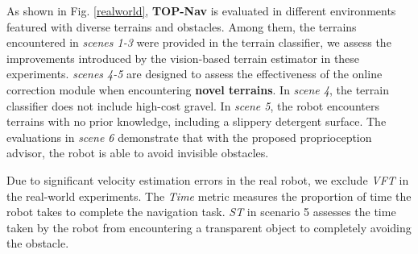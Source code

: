 \documentclass[conference]{IEEEtran}
\begin{document}
As shown in Fig. \ref{realworld}, \textbf{TOP-Nav} is evaluated in different environments featured with diverse terrains and obstacles. Among them, the terrains encountered in \textit{scenes 1-3} were provided in the terrain classifier, we assess the improvements introduced by the vision-based terrain estimator in these experiments. {\textit{scenes 4-5} are designed to assess the effectiveness of the online correction module when encountering \textbf{novel terrains}. In \textit{scene 4}, the terrain classifier does not include high-cost gravel. In \textit{scene 5}, the robot encounters terrains with no prior knowledge, including a slippery detergent surface.} The evaluations in \textit{scene 6} demonstrate that with the {proposed} proprioception advisor, the robot is able to avoid invisible obstacles.

Due to significant velocity estimation errors in the real robot, we exclude \textit{VFT} in the real-world experiments. The \textit{Time} metric measures the proportion of time the robot takes to complete the navigation task. \textit{ST} in scenario 5 assesses the time taken by the robot from encountering a transparent object to completely avoiding the obstacle.
\end{document}
